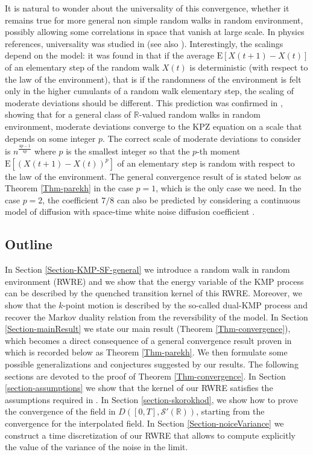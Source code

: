 \documentclass[a4paper,11pt,oneside,reqno]{amsart}
\theoremstyle{definition}
\newcommand{\R}{\ensuremath{\mathbb{R}}}
\numberwithin{equation}{section}
\begin{document}
 \medskip 
 It is natural to wonder about the universality of this convergence, whether it remains true for more general non simple random walks in random environment, possibly allowing some correlations in space that vanish at large scale. In {\color{black}physics} references, universality was studied in \cite{hass2025universal} (see also \cite{hass2024extreme, hass2024first, das2024multiplicative}). Interestingly, the scalings depend on the model: it was found in \cite{hass2025super} that  if the average $\mathrm E[X(t+1)-X(t)]$ of an  elementary step of the random walk $X(t)$ is deterministic (with respect to the law of the environment), that is if the randomness of the environment is felt only in the higher cumulants of a random walk elementary step, the scaling of moderate deviations should be different. This prediction was confirmed in \cite{parekh2}, showing that for a general class of $\R$-valued random walks in random environment, moderate deviations converge to the KPZ equation on a scale that depends on some integer $p$. The correct scale of moderate deviations to consider is $n^{\frac{4p-1}{4p}}$ where $p$ is the smallest integer so that the $p$-th moment $\mathrm E[(X(t+1)-X(t))^p]$ of an elementary step is random with respect to the law of the environment. The general convergence result of \cite{parekh2} is stated below as Theorem \ref{Thm-parekh} in the case $p=1$, which is the only case we need. In the case $p=2$, the coefficient $7/8$ can also be predicted by considering a continuous model of diffusion with space-time white noise diffusion coefficient \cite{ledoussal2023private}. 
 

 
 \subsection*{Outline}
 In Section \ref{Section-KMP-SF-general} we introduce a random walk in random environment (RWRE) and we show that the energy variable of the KMP process can be described by the quenched transition kernel of this RWRE. Moreover, we show that the $k$-point motion is described by the so-called dual-KMP process and recover the Markov duality relation \cite{kipnis1982heat,modelsOfTransport} from the reversibility of the model. In Section \ref{Section-mainResult} we state our main result (Theorem \ref{Thm-convergence}), which becomes a direct consequence of a general convergence result proven in \cite{parekh2} which is recorded below as Theorem \ref{Thm-parekh}. We then formulate some possible generalizations and conjectures suggested by our results. The following sections are devoted to the proof of Theorem \ref{Thm-convergence}. In Section \ref{section-assumptions} we show that the kernel of our RWRE {\color{black}satisfies} the assumptions required in \cite{parekh2}. In Section \ref{section-skorokhod}, we show how to prove the convergence of the field in $D([0,T],\mathcal{S}'(\R))$, starting {\color{black}from} the convergence for the interpolated field. In Section \ref{Section-noiceVariance} we construct a time discretization of our RWRE that allows to compute explicitly the value of the variance of the noise in the limit.
 
\end{document}
